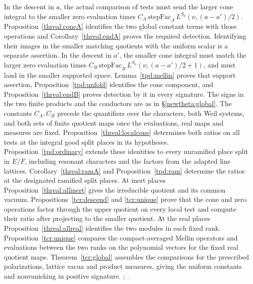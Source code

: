 In the descent in \(a\), the actual comparison of tests must send
the larger cone integral to the smaller zero evaluation times
\(C_A\,\mathrm{stepFac}_A\,L^{S_0}(\nu,(a-a')/2)\).
Proposition~\ref{threal:coneA} identifies the two global constant
terms with those operations and Corollary~\ref{threal:endA} proves
the required detection. Identifying their images in the smaller
matching quotients with the uniform scalar is a separate assertion.
In the descent in \(a'\), the smaller cone integral must match the
larger zero evaluation times
\(C_B\,\mathrm{stepFac}_B\,L^{S_0}(\nu,(a-a')/2+1)\), and must
land in the smaller supported space. Lemma~\ref{tpd:mellin}
proves that support assertion, Proposition~\ref{tpd:unfold}
identifies the cone component, and Proposition~\ref{threal:endB}
proves detection by it in every signature. The signs in the two
finite products and the conductors are as in \S\ref{newtheta:global}.
The constants \(C_A,C_B\) precede the quantifiers over the characters,
both Weil systems, and both sets of finite quotient maps once the
evaluations, real maps and measures are fixed.
Proposition~\ref{threal:localcone} determines both ratios on all
tests at the integral good split places in its hypotheses.
Proposition~\ref{tpd:ordinary} extends these identities to every
unramified place split in \(E/F\), including resonant characters
and the factors from the adapted line lattices.
Corollary~\ref{threal:ramA} and Proposition~\ref{tpd:ram} determine
the ratios at the designated ramified split places.
At inert places Proposition~\ref{threal:allinert} gives the
irreducible quotient and its common vacuum. Propositions~\ref{tcr:descend} and \ref{tcr:unique} prove that the
cone and zero operations factor through the upper quotient on every
local test and compute their ratio after projecting to the smaller quotient. At the real places
Proposition~\ref{threal:allreal} identifies the two modules in
each fixed rank. Proposition~\ref{tcr:unique} compares the compact-averaged
Mellin operators and evaluations between the two ranks on the
polynomial vectors for the fixed real quotient maps. Theorem~\ref{tcr:global}
assembles the comparisons for the prescribed polarizations, lattice vacua
and product measures, giving the uniform constants and nonvanishing in
positive signature.
;
.

